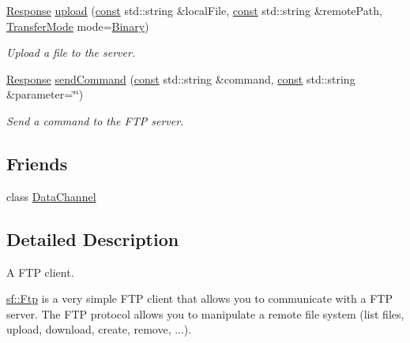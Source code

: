 \begin{DoxyCompactItemize}
\hyperlink{classsf_1_1_ftp_1_1_response}{Response} \hyperlink{classsf_1_1_ftp_a46d6e15cddd719288b5a08b685e11765}{upload} (\hyperlink{term__entry_8h_a57bd63ce7f9a353488880e3de6692d5a}{const} std\-::string \&local\-File, \hyperlink{term__entry_8h_a57bd63ce7f9a353488880e3de6692d5a}{const} std\-::string \&remote\-Path, \hyperlink{classsf_1_1_ftp_a1cd6b89ad23253f6d97e6d4ca4d558cb}{Transfer\-Mode} mode=\hyperlink{classsf_1_1_ftp_a1cd6b89ad23253f6d97e6d4ca4d558cba8d9a3497be63da2bf7ed663b1bfd7449}{Binary})
\begin{DoxyCompactList}\small\item\em Upload a file to the server. \end{DoxyCompactList}\item 
\hyperlink{classsf_1_1_ftp_1_1_response}{Response} \hyperlink{classsf_1_1_ftp_a44e095103ecbce175a33eaf0820440ff}{send\-Command} (\hyperlink{term__entry_8h_a57bd63ce7f9a353488880e3de6692d5a}{const} std\-::string \&command, \hyperlink{term__entry_8h_a57bd63ce7f9a353488880e3de6692d5a}{const} std\-::string \&parameter=\char`\"{}\char`\"{})
\begin{DoxyCompactList}\small\item\em Send a command to the F\-T\-P server. \end{DoxyCompactList}\end{DoxyCompactItemize}
\subsection*{Friends}
\begin{DoxyCompactItemize}
\item 
class \hyperlink{classsf_1_1_ftp_aafee9e6471e9ba6590613dc367c65503}{Data\-Channel}
\end{DoxyCompactItemize}


\subsection{Detailed Description}
A F\-T\-P client. 

\hyperlink{classsf_1_1_ftp}{sf\-::\-Ftp} is a very simple F\-T\-P client that allows you to communicate with a F\-T\-P server. The F\-T\-P protocol allows you to manipulate a remote file system (list files, upload, download, create, remove, ...).

